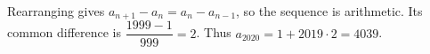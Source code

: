Rearranging gives $a_{n+1}-a_n=a_n-a_{n-1}$, so the sequence is arithmetic. Its common difference is $\dfrac{1999-1}{999}=2$. Thus $a_{2020}=1+2019\cdot2=\boxed{4039}$.
